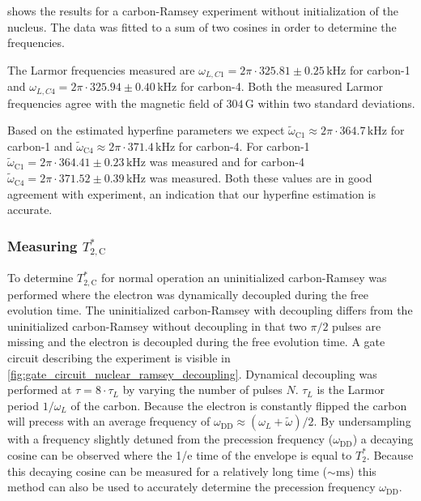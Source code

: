  shows the results for a carbon-Ramsey experiment without initialization of the nucleus.
The data was fitted to a sum of two cosines in order to determine the frequencies.

The Larmor frequencies measured are $\omega_{L,C1} = 2\pi\cdot 325.81 \pm 0.25\, \mathrm{kHz}$  for carbon-1 and  $\omega_{L,C4} =  2\pi\cdot 325.94 \pm 0.40\, \mathrm{kHz}$ for carbon-4.
Both the measured Larmor frequencies agree with the magnetic field of $304\, \mathrm{G}$ within two standard deviations.

Based on the estimated hyperfine parameters we expect $\tilde\omega_{\mathrm{C1}} \approx 2\pi\cdot 364.7\, \mathrm{kHz}$ for carbon-1 and $\tilde \omega_{\mathrm{C4}} \approx 2\pi\cdot 371.4\, \mathrm{kHz}$ for carbon-4.
For carbon-1 $\tilde \omega_{\mathrm{C1}}= 2\pi\cdot 364.41 \pm 0.23\, \mathrm{kHz}$ was measured
and for carbon-4 $\tilde \omega_{\mathrm{C4}} = 2\pi\cdot 371.52 \pm 0.39 \, \mathrm{kHz}$ was measured.
Both these values are in good agreement with experiment, an indication that our hyperfine estimation is accurate.


\subsubsection{Measuring $T_{2,\mathrm{C}}^* $}

To determine $T_{2,\mathrm{C}}^* $ for normal operation an uninitialized carbon-Ramsey was performed where the electron was dynamically decoupled during the free evolution time.
The uninitialized carbon-Ramsey with decoupling differs from the uninitialized carbon-Ramsey without decoupling in that two $\pi/2$ pulses are missing and the electron is decoupled during the free evolution time. A gate circuit describing the experiment is visible in \cref{fig:gate_circuit_nuclear_ramsey_decoupling}.
Dynamical decoupling was performed at $\tau = 8\cdot \tau_L$ by varying the number of pulses $N$. $\tau_L$ is the Larmor period $1/\omega_L$ of the carbon.
Because the electron is constantly flipped the carbon will precess with an average frequency of $\omega_{\mathrm{DD}} \approx (\omega_L +\tilde{\omega} )/2$.
By undersampling with a frequency slightly detuned from the precession frequency ($\omega_{\mathrm{DD}}$) a decaying cosine can be observed where the 1/e time of the envelope is equal to $T_2^*$.
Because this decaying cosine can be measured for a relatively long time ($\sim \mathrm{ms}$) this method can also be used to accurately determine the precession frequency $\omega_\mathrm{DD}$.

